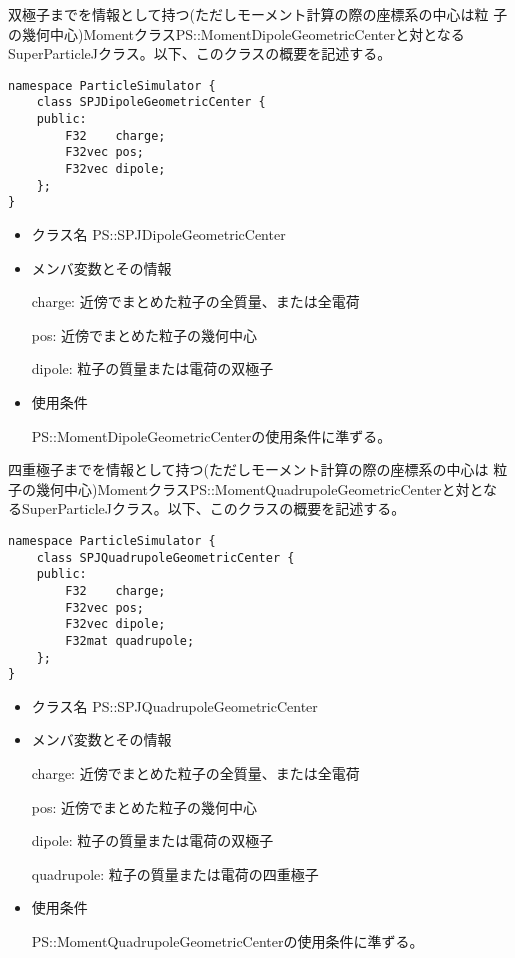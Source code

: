 
双極子までを情報として持つ(ただしモーメント計算の際の座標系の中心は粒
子の幾何中心)MomentクラスPS::MomentDipoleGeometricCenterと対となる
SuperParticleJクラス。以下、このクラスの概要を記述する。
\begin{screen}
\begin{verbatim}
namespace ParticleSimulator {
    class SPJDipoleGeometricCenter {
    public:
        F32    charge;    
        F32vec pos;
        F32vec dipole;
    };
}
\end{verbatim}
\end{screen}

\begin{itemize}
\item クラス名
  PS::SPJDipoleGeometricCenter

\item メンバ変数とその情報

  charge: 近傍でまとめた粒子の全質量、または全電荷

  pos: 近傍でまとめた粒子の幾何中心

  dipole: 粒子の質量または電荷の双極子

\item 使用条件

  PS::MomentDipoleGeometricCenterの使用条件に準ずる。

\end{itemize}


四重極子までを情報として持つ(ただしモーメント計算の際の座標系の中心は
粒子の幾何中心)MomentクラスPS::MomentQuadrupoleGeometricCenterと対とな
るSuperParticleJクラス。以下、このクラスの概要を記述する。
\begin{screen}
\begin{verbatim}
namespace ParticleSimulator {
    class SPJQuadrupoleGeometricCenter {
    public:
        F32    charge;    
        F32vec pos;
        F32vec dipole;
        F32mat quadrupole;
    };
}
\end{verbatim}
\end{screen}

\begin{itemize}
\item クラス名
  PS::SPJQuadrupoleGeometricCenter

\item メンバ変数とその情報

  charge: 近傍でまとめた粒子の全質量、または全電荷

  pos: 近傍でまとめた粒子の幾何中心

  dipole: 粒子の質量または電荷の双極子

  quadrupole: 粒子の質量または電荷の四重極子

\item 使用条件

  PS::MomentQuadrupoleGeometricCenterの使用条件に準ずる。

\end{itemize}

